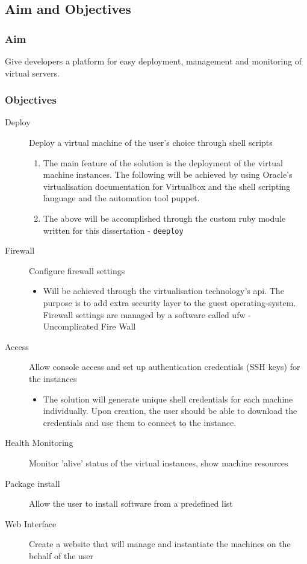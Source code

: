 \documentclass{article}
\begin{document}
\subsection{Aim and Objectives}
\subsubsection{Aim}
Give developers a platform for easy deployment, management and monitoring of virtual servers.
\subsubsection{Objectives}

\begin{description}
    \item[Deploy\label{itm:deploy}]Deploy a virtual machine of the user's choice through shell scripts
          \begin{enumerate}
              \item The main feature of the solution is the deployment of the virtual machine instances. The following will be achieved by using Oracle's virtualisation documentation for Virtualbox and the shell scripting language and the automation tool \gls{puppet}.
              \item The above will be accomplished through the custom ruby module written for this dissertation - \texttt{deeploy}
          \end{enumerate}

    \item[Firewall\label{itm:firewall}]Configure firewall settings
          \begin{itemize}
              \item Will be achieved through the virtualisation technology's \gls{api}. The purpose is to add extra security layer to the guest \gls{operating-system}. Firewall settings are managed by a software called ufw - Uncomplicated Fire Wall
          \end{itemize}

    \item[Access\label{itm:access}]Allow console access and set up authentication credentials (SSH keys) for the instances
          \begin{itemize}
              \item The solution will generate unique shell credentials for each machine individually. Upon creation, the user should be able to download the credentials and use them to connect to the instance.
          \end{itemize}
    \item[Health Monitoring\label{itm:healthmonitor}]Monitor 'alive' status of the virtual instances, show machine resources
    \item[Package install\label{itm:packages}]Allow the user to install software from a predefined list
    \item[Web Interface\label{itm:website}]Create a website that will manage and instantiate the machines on the behalf of the user
\end{description}
\end{document}
